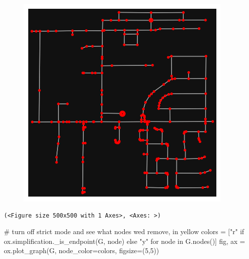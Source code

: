 \documentclass[
  letterpaper,
  DIV=11,
  numbers=noendperiod]{scrreprt}
\newenvironment{Shaded}{\begin{snugshade}}{\end{snugshade}}
\newcommand{\CommentTok}[1]{\textcolor[rgb]{0.37,0.37,0.37}{#1}}
\newcommand{\ControlFlowTok}[1]{\textcolor[rgb]{0.00,0.23,0.31}{#1}}
\newcommand{\DecValTok}[1]{\textcolor[rgb]{0.68,0.00,0.00}{#1}}
\newcommand{\KeywordTok}[1]{\textcolor[rgb]{0.00,0.23,0.31}{#1}}
\newcommand{\NormalTok}[1]{\textcolor[rgb]{0.00,0.23,0.31}{#1}}
\newcommand{\OperatorTok}[1]{\textcolor[rgb]{0.37,0.37,0.37}{#1}}
\newcommand{\StringTok}[1]{\textcolor[rgb]{0.13,0.47,0.30}{#1}}
\begin{document}
\begin{figure}[H]

{\centering \includegraphics{labs/w07_OSM_files/figure-pdf/cell-15-output-1.png}

}

\end{figure}

\begin{verbatim}
(<Figure size 500x500 with 1 Axes>, <Axes: >)
\end{verbatim}

\begin{Shaded}
\begin{Highlighting}[]
\CommentTok{\# turn off strict mode and see what nodes we\textquotesingle{}d remove, in yellow}
\NormalTok{colors }\OperatorTok{=}\NormalTok{ [}\StringTok{"r"} \ControlFlowTok{if}\NormalTok{ ox.simplification.\_is\_endpoint(G, node) }\ControlFlowTok{else} \StringTok{"y"} \ControlFlowTok{for}\NormalTok{ node }\KeywordTok{in}\NormalTok{ G.nodes()]}
\NormalTok{fig, ax }\OperatorTok{=}\NormalTok{ ox.plot\_graph(G, node\_color}\OperatorTok{=}\NormalTok{colors, figsize}\OperatorTok{=}\NormalTok{(}\DecValTok{5}\NormalTok{,}\DecValTok{5}\NormalTok{))}
\end{Highlighting}
\end{Shaded}
\end{document}
